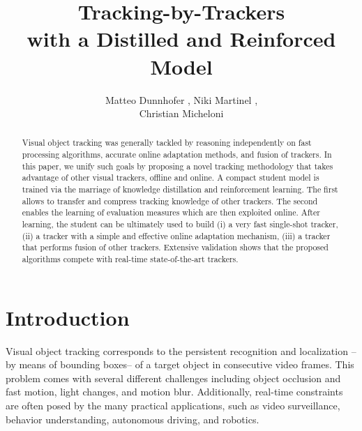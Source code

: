 \documentclass[runningheads]{llncs}
\begin{document}
\pagestyle{headings}
\mainmatter

\def\ACCV20SubNumber{141}  

\title{Tracking-by-Trackers \\with a Distilled and Reinforced Model} 
\author{Matteo Dunnhofer ,
Niki Martinel , \\
Christian Micheloni  \\
\footnotesize{}
}





\maketitle

\begin{abstract}
Visual object tracking was generally tackled by reasoning independently on fast processing algorithms, accurate online adaptation methods, and fusion of trackers. 
In this paper, we unify such goals by proposing a novel tracking methodology that takes advantage of other visual trackers, offline and online. 
A compact student model is trained via the marriage of knowledge distillation and reinforcement learning. The first allows to transfer and compress tracking knowledge of other trackers. The second enables the learning of  evaluation measures which are then exploited online. After learning, the student can be ultimately used to build (i) a very fast single-shot tracker, (ii) a tracker with a simple and effective online adaptation mechanism, (iii) a tracker that performs fusion of other trackers.
Extensive validation shows that the proposed algorithms compete with real-time state-of-the-art trackers. \end{abstract}

\section{Introduction}
\label{sec:intro}
Visual object tracking corresponds to the persistent recognition and localization --by means of bounding boxes-- of a target object in consecutive video frames.
This problem comes with several different challenges including object occlusion and fast motion, light changes, and motion blur.
Additionally, real-time constraints are often posed by the many practical applications, such as video surveillance, behavior understanding, autonomous driving, and robotics.
\end{document}
